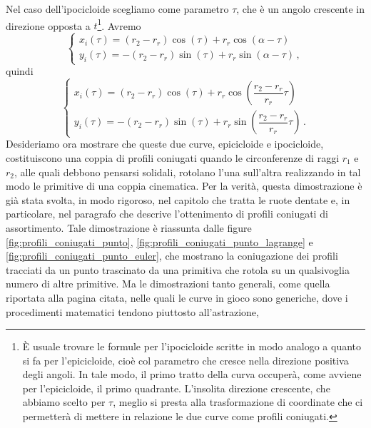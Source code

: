 \noindent Nel caso dell'ipocicloide scegliamo come parametro $\tau$,
che \`e un angolo crescente in direzione opposta a $t$\footnote{
\`E usuale trovare le formule per l'ipocicloide scritte in modo analogo
a quanto si fa per l'epicicloide, cio\`e col parametro che cresce nella
direzione positiva degli angoli. In tale modo, il primo tratto della curva
occuper\`a, come avviene per l'epicicloide, il primo quadrante. L'insolita
direzione
crescente, che abbiamo scelto per $\tau$, meglio si presta alla trasformazione
di coordinate che ci
permetter\`a di mettere in relazione le due curve come profili coniugati.
}. Avremo
\begin{equation}
\begin{cases}
{x_i}\left(\tau\right)=\left(r_2-r_r\right)\cos\left(\tau\right) +
r_r\cos\left(\alpha- \tau\right) \\
{y_i}\left(\tau\right)=-\left(r_2-r_r\right)\sin\left(\tau\right)+
r_r\sin\left(\alpha -\tau\right) \,,
\end{cases}
\end{equation}
\noindent quindi
\begin{equation}
\begin{cases}
{x_i}\left(\tau\right)=\left(r_2-r_r\right)\cos\left(\tau\right) +
r_r\cos\left(\dfrac{r_2-r_r}{r_r}\tau\right) \\
{y_i}\left(\tau\right)=-\left(r_2-r_r\right)\sin\left(\tau\right)+
r_r\sin\left(\dfrac{r_2-r_r}{r_r}\tau\right)\,.
\end{cases}
\label{eq:ipocicloide}
\end{equation}
\noindent Desideriamo ora mostrare che queste due curve, epicicloide
e ipocicloide, costituiscono una coppia di profili coniugati quando
le circonferenze di raggi $r_1$ e $r_2$, alle quali debbono pensarsi solidali,
rotolano l'una sull'altra realizzando in tal modo 
le primitive di una coppia cinematica. Per la verit\`a, questa dimostrazione 
\`e gi\`a stata svolta, in modo rigoroso, nel capitolo che tratta le ruote
dentate e, in particolare, nel paragrafo che descrive l'ottenimento
di profili coniugati di assortimento. Tale dimostrazione
\`e riassunta dalle figure
\ref{fig:profili_coniugati_punto},
\ref{fig:profili_coniugati_punto_lagrange} e
\ref{fig:profili_coniugati_punto_euler},
che mostrano la coniugazione dei profili tracciati da un punto
trascinato da una primitiva che rotola su un qualsivoglia numero di altre
primitive.
Ma le dimostrazioni tanto generali, come quella riportata alla pagina
citata, nelle quali le curve in gioco 
sono generiche, dove
i procedimenti matematici tendono piuttosto all'astrazione,
